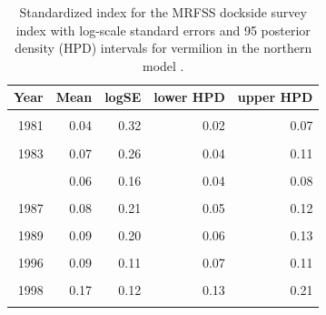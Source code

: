 \documentclass[11pt,
  english,
  a4paper,
]{article}
\begin{document}
\begin{table}

\caption{\label{tab:tab-index-mrfss}Standardized index for the MRFSS dockside survey index with log-scale standard errors and 95%
       posterior density (HPD) intervals for vermilion in the northern model .}
\centering
\begin{tabular}[t]{rrrrr}
\toprule
Year & Mean & logSE & lower HPD & upper HPD\\
\midrule
\cellcolor{gray!6}{1980} & \cellcolor{gray!6}{0.05} & \cellcolor{gray!6}{0.21} & \cellcolor{gray!6}{0.04} & \cellcolor{gray!6}{0.08}\\
1981 & 0.04 & 0.32 & 0.02 & 0.07\\
\cellcolor{gray!6}{1982} & \cellcolor{gray!6}{0.05} & \cellcolor{gray!6}{0.23} & \cellcolor{gray!6}{0.03} & \cellcolor{gray!6}{0.07}\\
1983 & 0.07 & 0.26 & 0.04 & 0.11\\
\cellcolor{gray!6}{1984} & \cellcolor{gray!6}{0.09} & \cellcolor{gray!6}{0.20} & \cellcolor{gray!6}{0.06} & \cellcolor{gray!6}{0.13}\\
\addlinespace
1985 & 0.06 & 0.16 & 0.04 & 0.08\\
\cellcolor{gray!6}{1986} & \cellcolor{gray!6}{0.07} & \cellcolor{gray!6}{0.17} & \cellcolor{gray!6}{0.05} & \cellcolor{gray!6}{0.10}\\
1987 & 0.08 & 0.21 & 0.05 & 0.12\\
\cellcolor{gray!6}{1988} & \cellcolor{gray!6}{0.11} & \cellcolor{gray!6}{0.18} & \cellcolor{gray!6}{0.08} & \cellcolor{gray!6}{0.15}\\
1989 & 0.09 & 0.20 & 0.06 & 0.13\\
\addlinespace
\cellcolor{gray!6}{1995} & \cellcolor{gray!6}{0.08} & \cellcolor{gray!6}{0.19} & \cellcolor{gray!6}{0.05} & \cellcolor{gray!6}{0.12}\\
1996 & 0.09 & 0.11 & 0.07 & 0.11\\
\cellcolor{gray!6}{1997} & \cellcolor{gray!6}{0.23} & \cellcolor{gray!6}{0.11} & \cellcolor{gray!6}{0.18} & \cellcolor{gray!6}{0.29}\\
1998 & 0.17 & 0.12 & 0.13 & 0.21\\
\cellcolor{gray!6}{1999} & \cellcolor{gray!6}{0.09} & \cellcolor{gray!6}{0.12} & \cellcolor{gray!6}{0.07} & \cellcolor{gray!6}{0.11}\\
\bottomrule
\end{tabular}
\end{table}
\end{document}
